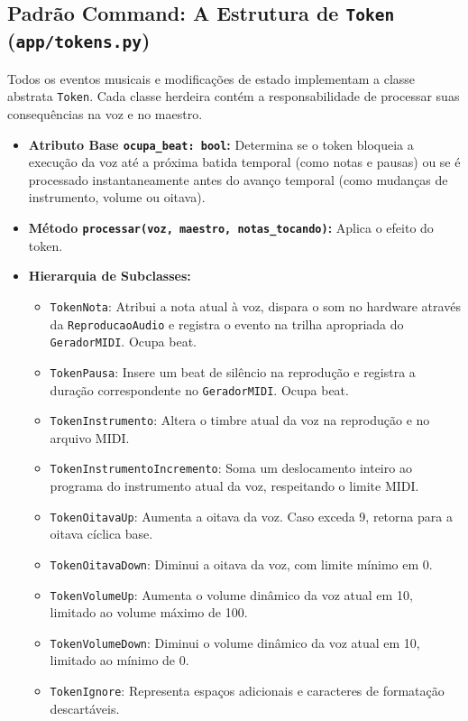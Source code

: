 \documentclass[12pt, a4paper]{article}
\begin{document}
\subsection{Padrão Command: A Estrutura de \texttt{Token} (\texttt{app/tokens.py})}
Todos os eventos musicais e modificações de estado implementam a classe abstrata \texttt{Token}. Cada classe herdeira contém a responsabilidade de processar suas consequências na voz e no maestro.
\begin{itemize}
  \item \textbf{Atributo Base \texttt{ocupa\_beat: bool}:} Determina se o token bloqueia a execução da voz até a próxima batida temporal (como notas e pausas) ou se é processado instantaneamente antes do avanço temporal (como mudanças de instrumento, volume ou oitava).
  \item \textbf{Método \texttt{processar(voz, maestro, notas\_tocando)}:} Aplica o efeito do token.
  \item \textbf{Hierarquia de Subclasses:}
    \begin{itemize}
      \item \texttt{TokenNota}: Atribui a nota atual à voz, dispara o som no hardware através da \texttt{ReproducaoAudio} e registra o evento na trilha apropriada do \texttt{GeradorMIDI}. Ocupa beat.
      \item \texttt{TokenPausa}: Insere um beat de silêncio na reprodução e registra a duração correspondente no \texttt{GeradorMIDI}. Ocupa beat.
      \item \texttt{TokenInstrumento}: Altera o timbre atual da voz na reprodução e no arquivo MIDI.
      \item \texttt{TokenInstrumentoIncremento}: Soma um deslocamento inteiro ao programa do instrumento atual da voz, respeitando o limite MIDI.
      \item \texttt{TokenOitavaUp}: Aumenta a oitava da voz. Caso exceda 9, retorna para a oitava cíclica base.
      \item \texttt{TokenOitavaDown}: Diminui a oitava da voz, com limite mínimo em 0.
      \item \texttt{TokenVolumeUp}: Aumenta o volume dinâmico da voz atual em 10, limitado ao volume máximo de 100.
      \item \texttt{TokenVolumeDown}: Diminui o volume dinâmico da voz atual em 10, limitado ao mínimo de 0.

      \item \texttt{TokenIgnore}: Representa espaços adicionais e caracteres de formatação descartáveis.
    \end{itemize}
\end{itemize}
\end{document}
